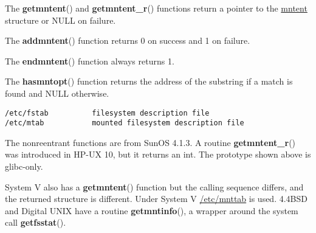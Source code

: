 \documentclass[]{article}
\let\realtextbf=\textbf
\renewcommand{\textbf}[1]{\textcolor{boldcolor}{\realtextbf{#1}}}
\renewcommand{\emph}[1]{\underline{#1}}
\begin{document}

The \textbf{getmntent}() and \textbf{getmntent\_r}() functions return a
pointer to the \emph{mntent} structure or NULL on failure.

The \textbf{addmntent}() function returns 0 on success and 1 on failure.

The \textbf{endmntent}() function always returns 1.

The \textbf{hasmntopt}() function returns the address of the substring
if a match is found and NULL otherwise.


\begin{verbatim}
/etc/fstab          filesystem description file
/etc/mtab           mounted filesystem description file
\end{verbatim}


The nonreentrant functions are from SunOS 4.1.3. A routine
\textbf{getmntent\_r}() was introduced in HP-UX 10, but it returns an
int. The prototype shown above is glibc-only.


System V also has a \textbf{getmntent}() function but the calling
sequence differs, and the returned structure is different. Under System
V \emph{/etc/mnttab} is used. 4.4BSD and Digital UNIX have a routine
\textbf{getmntinfo}(), a wrapper around the system call
\textbf{getfsstat}().

\end{document}
